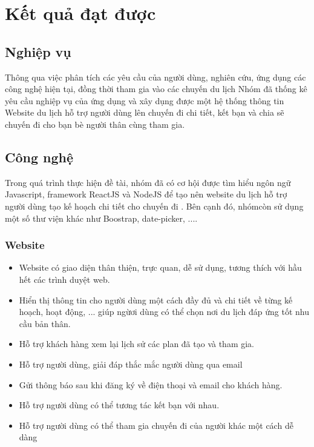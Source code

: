 \section{Kết quả đạt được}
\subsection{Nghiệp vụ}
Thông qua việc phân tích các yêu cầu của người dùng, nghiên cứu, ứng dụng các công nghệ hiện tại, đồng thời tham gia vào các chuyến du lịch Nhóm đã thống kê yêu cầu nghiệp vụ của ứng dụng và  xây dụng được một hệ thống thông tin Website du lịch hỗ trợ người dùng lên chuyến đi chi tiết, kết bạn và chia sẽ chuyến đi cho bạn bè người thân cùng tham gia. 

\subsection{Công nghệ}
Trong quá trình thực hiện đề tài, nhóm đã có cơ hội được tìm hiểu ngôn ngữ Javascript, framework ReactJS và NodeJS để tạo nên website du lịch hỗ trợ người dùng tạo kế hoạch chi tiết cho chuyến đi . Bên cạnh đó, nhómcòn sử dụng một số thư viện khác như Boostrap, date-picker, ....

\subsubsection{Website}
\begin{itemize}
    \item Website có giao diện thân thiện, trực quan, dễ sử dụng, tương thích với hầu hết các trình duyệt web.
    \item Hiển thị thông tin cho người dùng một cách đầy đủ và chi tiết về từng kế hoạch, hoạt động, ... giúp ngừơi dùng có thể chọn nơi du lịch đáp ứng tốt nhu cầu bản thân.
    \item Hỗ trợ khách hàng xem lại lịch sử các plan đã tạo và tham gia.
    \item Hỗ trợ người dùng, giải đáp thắc mắc người dùng qua email
    \item Gửi thông báo sau khi đăng ký về điện thoại và email cho khách hàng.
    \item Hỗ trợ người dùng có thể tương tác kết bạn với nhau.
    \item Hỗ trợ người dùng có thể tham gia chuyến đi của người khác một cách dễ dàng
\end{itemize}


